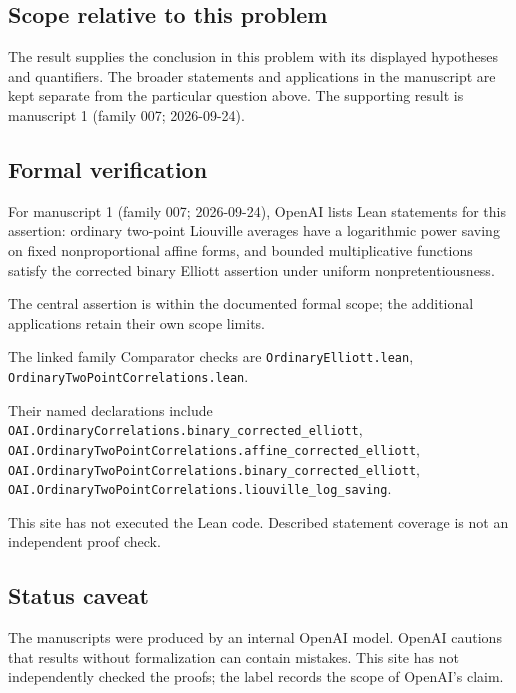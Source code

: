 \documentclass[11pt]{article}
\begin{document}
\subsection{Scope relative to this problem}
The result supplies the conclusion in this problem with its displayed hypotheses and quantifiers. The broader statements and applications in the manuscript are kept separate from the particular question above. The supporting result is manuscript 1 (family 007; 2026-09-24).

\subsection{Formal verification}
For manuscript 1 (family 007; 2026-09-24), OpenAI lists Lean statements for this assertion: ordinary two-point Liouville averages have a logarithmic power saving on fixed nonproportional affine forms, and bounded multiplicative functions satisfy the corrected binary Elliott assertion under uniform nonpretentiousness.

The central assertion is within the documented formal scope; the additional applications retain their own scope limits.

The linked family Comparator checks are \texttt{OrdinaryElliott.lean}, \texttt{OrdinaryTwoPointCorrelations.lean}.

Their named declarations include \texttt{OAI.OrdinaryCorrelations.binary\_corrected\_elliott}, \texttt{OAI.OrdinaryTwoPointCorrelations.affine\_corrected\_elliott}, \texttt{OAI.OrdinaryTwoPointCorrelations.binary\_corrected\_elliott}, \texttt{OAI.OrdinaryTwoPointCorrelations.liouville\_log\_saving}.

This site has not executed the Lean code. Described statement coverage is not an independent proof check.

\subsection{Status caveat}
The manuscripts were produced by an internal OpenAI model. OpenAI cautions that results without formalization can contain mistakes. This site has not independently checked the proofs; the label records the scope of OpenAI's claim.
\end{document}

